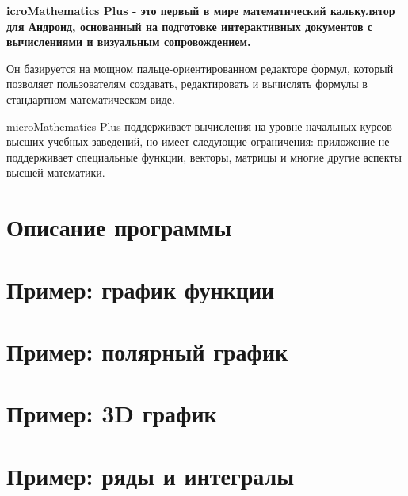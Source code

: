 \documentclass[DIV=calc, paper=a4, fontsize=11pt, twocolumn]{scrartcl}
\begin{document}
\maketitle
\thispagestyle{fancy} %

\textbf{icroMathematics Plus - это первый в мире математический
калькулятор для Андроид, основанный на подготовке интерактивных документов с
вычислениями и визуальным сопровождением.}

\begin{bf}
Он базируется на мощном пальце-ориентированном редакторе формул, который
позволяет пользователям создавать, редактировать и вычислять формулы в
стандартном математическом виде.

microMathematics Plus поддерживает вычисления на уровне начальных курсов
высших учебных заведений, но имеет следующие ограничения: приложение не
поддерживает специальные функции, векторы, матрицы и многие другие аспекты
высшей математики.
\end{bf}

\section{Описание программы}


\section{Пример: график функции}


\section{Пример: полярный график}


\section{Пример: 3D график}


\section{Пример: ряды и интегралы}

\end{document}
